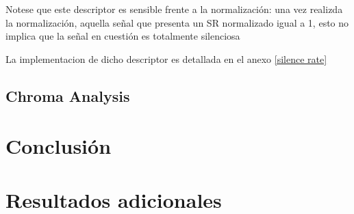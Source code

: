 \documentclass[]{article}
\begin{document}
\begin{multicols}{2}
Notese que este descriptor es sensible frente a la normalización:
una vez realizda la normalización, aquella señal que presenta un SR
normalizado igual a 1, esto no implica que la señal en cuestión es totalmente silenciosa

La implementacion de dicho descriptor es detallada en el anexo \ref{silence rate}

\subsection{Chroma Analysis}




\section{Conclusión}
\printbibliography
\end{multicols}

\newpage

\appendix
\section{Resultados adicionales}
\end{document}
